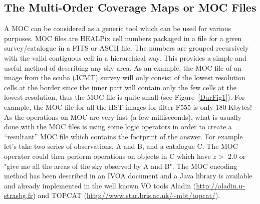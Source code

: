 \subsection{The Multi-Order Coverage Maps or MOC Files}
A MOC can be considered as a generic tool which can be used for various purposes. MOC files are HEALPix cell numbers packaged in a file for a given survey/catalogue in a FITS or ASCII file. The numbers are grouped recursively with the valid contiguous cell in a hierarchical way. This provides a simple and useful method of describing any sky area. As an example, the MOC file of an image from the scuba (JCMT) survey will only consist of the lowest resolution cells at the border since the inner part will contain only the few cells at the lowest resolution, thus the MOC file is quite small (see Figure~\ref{DurFig1}). For example, the MOC file for all the HST images for filter F555 is only 180 Kbytes! As the operations on MOC are very fast (a few milliseconds), what is usually done with the MOC files is using some logic operators in order to create a ``resultant'' MOC file which contains the footprint of the answer. For example let's take two series of observations, A and B, and a catalogue C. The MOC operator could then perform operations on objects in C which have $z >$ 2.0 or "give me all the areas of the sky observed by A and B".  The MOC encoding method has been described in an IVOA document and a Java library is available and already implemented in the well known VO tools Aladin (\url{http://aladin.u-strasbg.fr}) and TOPCAT (\url{http://www.star.bris.ac.uk/~mbt/topcat/}).


